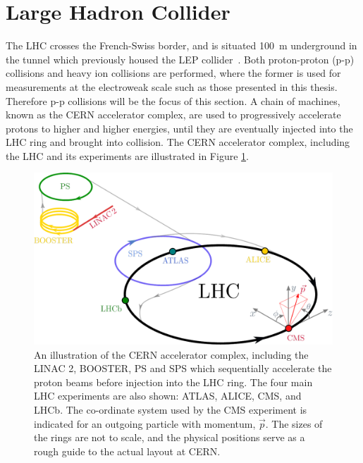 
\section{Large Hadron Collider}\label{sec:lhc}
The LHC crosses the French-Swiss border, and is situated 100~m underground in the tunnel which previously housed the LEP collider~\cite{lep_design}. Both proton-proton (p-p) collisions and heavy ion collisions are performed, where the former is used for measurements at the electroweak scale such as those presented in this thesis. Therefore p-p collisions will be the focus of this section. A chain of machines, known as the CERN accelerator complex, are used to progressively accelerate protons to higher and higher energies, until they are eventually injected into the LHC ring and brought into collision. The CERN accelerator complex, including the LHC and its experiments are illustrated in Figure \ref{fig:cern_accelerator_complex}.

\begin{figure}
  \centering
  \includegraphics[width=1\textwidth]{Figures/cms/lhc.pdf}
  \caption[The CERN accelerator complex]
  {
    An illustration of the CERN accelerator complex, including the LINAC 2, BOOSTER, PS and SPS which sequentially accelerate the proton beams before injection into the LHC ring. The four main LHC experiments are also shown: ATLAS, ALICE, CMS, and LHCb. The co-ordinate system used by the CMS experiment is indicated for an outgoing particle with momentum, $\vec{p}$. The sizes of the rings are not to scale, and the physical positions serve as a rough guide to the actual layout at CERN.
  }
  \label{fig:cern_accelerator_complex}
\end{figure}

